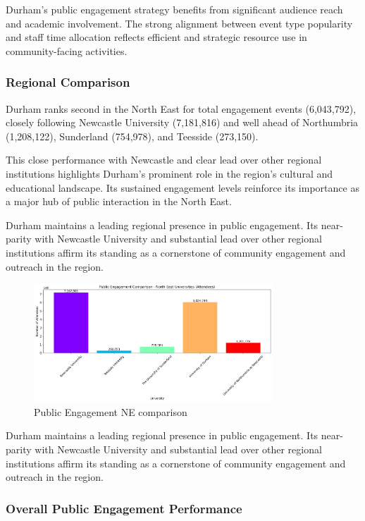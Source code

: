 \documentclass[journal,onecolumn, 10pt,draftclsnofoot]{IEEEtran}
\begin{document}
Durham's public engagement strategy benefits from significant audience reach and academic involvement. The strong alignment between event type popularity and staff time allocation reflects efficient and strategic resource use in community-facing activities.

\subsubsection{Regional Comparison}

Durham ranks second in the North East for total engagement events (6,043,792), closely following Newcastle University (7,181,816) and well ahead of Northumbria (1,208,122), Sunderland (754,978), and Teesside (273,150).

This close performance with Newcastle and clear lead over other regional institutions highlights Durham's prominent role in the region's cultural and educational landscape. Its sustained engagement levels reinforce its importance as a major hub of public interaction in the North East.



Durham maintains a leading regional presence in public engagement. Its near-parity with Newcastle University and substantial lead over other regional institutions affirm its standing as a cornerstone of community engagement and outreach in the region.

\begin{figure}[h]
\centering
\includegraphics[width=0.8\textwidth]{Fig/figure34.ne_comparison.png}
\caption{Public Engagement NE comparison}
\label{fig:ne-comparison}
\end{figure}

Durham maintains a leading regional presence in public engagement. Its near-parity with Newcastle University and substantial lead over other regional institutions affirm its standing as a cornerstone of community engagement and outreach in the region.

\subsubsection{Overall Public Engagement Performance}
\end{document}
